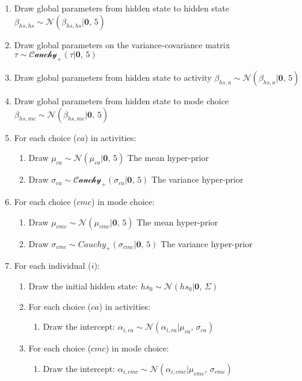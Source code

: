 \documentclass{article}
\begin{document}
\begin{enumerate}
    \item Draw global parameters from hidden state to hidden state $\beta_{hs, hs} \sim \mathcal{N}(\beta_{hs, hs} | \textbf{0}, \, 5)$
    \item Draw global parameters on the variance-covariance matrix $\tau \sim \mathcal{Cauchy_{+}}(\tau | \textbf{0}, \, 5)$
    \item Draw global parameters from hidden state to activity     $\beta_{hs, a} \sim \mathcal{N}(\beta_{hs, a} | \textbf{0}, \, 5)$
    \item Draw global parameters from hidden state to mode choice  $\beta_{hs, mc} \sim \mathcal{N}(\beta_{hs, mc} | \textbf{0}, \, 5)$
    \item For each choice ($ca$) in activities:
    \begin{enumerate}
        \item Draw $\mu_{ca} \sim \mathcal{N}(\mu_{ca} | \textbf{0}, \, 5)$  The mean hyper-prior
        \item Draw $\sigma_{ca} \sim \mathcal{Cauchy_{+}}(\sigma_{ca} | \textbf{0}, \, 5)$ The variance hyper-prior
    \end{enumerate}
    \item For each choice ($cmc$) in mode choice:
    \begin{enumerate}
        \item Draw $\mu_{cmc} \sim \mathcal{N}(\mu_{cmc} | \textbf{0}, \, 5)$  The mean hyper-prior
        \item Draw $\sigma_{cmc} \sim Cauchy_{+}(\sigma_{cmc} | \textbf{0}, \, 5)$  The variance hyper-prior
    \end{enumerate}
    \item For each individual ($i$):
    \begin{enumerate}
        \item Draw the initial hidden state: $hs_{0} \sim \mathcal{N}(hs_{0} | \textbf{0}, \, \Sigma)$
        \item For each choice ($ca$) in activities:
        \begin{enumerate}
            \item Draw the intercept: $\alpha_{i, ca} \sim \mathcal{N}(\alpha_{i, ca} | \mu_{ca}, \, \sigma_{ca})$
        \end{enumerate}
        \item For each choice ($cmc$) in mode choice:
        \begin{enumerate}
            \item Draw the intercept: $\alpha_{i, cmc} \sim \mathcal{N}(\alpha_{i, cmc} | \mu_{cmc}, \, \sigma_{cmc})$

\end{enumerate}
\end{enumerate}
\end{enumerate}
\end{document}
